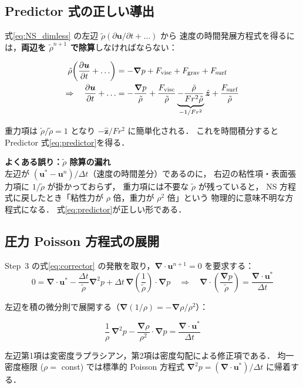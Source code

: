 \documentclass[12pt, a4paper, titlepage]{article}
\newcommand{\jp}[1]{{\normalfont\jpfont #1}}
\newcommand{\pd}[2]{\dfrac{\partial #1}{\partial #2}}
\newcommand{\bu}{\bm{u}}
\newcommand{\bnabla}{\bm{\nabla}}
\begin{document}
\subsection{\jp{Predictor 式の正しい導出}}

\jp{式\eqref{eq:NS_dimless} の左辺 $\tilde\rho(\partial\bu/\partial t + \ldots)$ から
速度の時間発展方程式を得るには，\textbf{両辺を $\tilde\rho^{n+1}$ で除算}しなければならない：}

\begin{align}
  \tilde\rho\!\left(\pd{\bu}{t} + \ldots\right) &= -\bnabla p + F_{\mathrm{visc}} + F_{\mathrm{grav}} + F_{\mathrm{surf}} \notag\\
  \Rightarrow\quad
  \pd{\bu}{t} + \ldots &= -\frac{\bnabla p}{\tilde\rho} + \frac{F_{\mathrm{visc}}}{\tilde\rho}
    \underbrace{- \frac{\tilde\rho}{Fr^2\tilde\rho}}_{-1/Fr^2}\hat{\bm{z}} + \frac{F_{\mathrm{surf}}}{\tilde\rho}
\end{align}

\jp{重力項は $\tilde\rho/\tilde\rho = 1$ となり $-\hat{\bm{z}}/Fr^2$ に簡単化される．
これを時間積分すると Predictor 式\eqref{eq:predictor}を得る．}

\begin{tcolorbox}[warnbox]
\textbf{\jp{よくある誤り：$\tilde\rho$ 除算の漏れ}}\\
\jp{左辺が $(\bu^*-\bu^n)/\Delta t$（速度の時間差分）であるのに，
右辺の粘性項・表面張力項に $1/\tilde\rho$ が掛かっておらず，
重力項には不要な $\tilde\rho$ が残っていると，
NS 方程式に戻したとき「粘性力が $\rho$ 倍，重力が $\rho^2$ 倍」という
物理的に意味不明な方程式になる．
式\eqref{eq:predictor}が正しい形である．}
\end{tcolorbox}

\subsection{\jp{圧力 Poisson 方程式の展開}}

\jp{Step~3 の式\eqref{eq:corrector} の発散を取り，$\bnabla\cdot\bu^{n+1}=0$ を要求する：}
\begin{equation}
  0 = \bnabla\cdot\bu^* - \frac{\Delta t}{\tilde\rho}\bnabla^2 p
    + \Delta t\,\bnabla\!\left(\frac{1}{\tilde\rho}\right)\cdot\bnabla p
  \quad\Rightarrow\quad
  \bnabla\cdot\!\left(\frac{\bnabla p}{\tilde\rho}\right) = \frac{\bnabla\cdot\bu^*}{\Delta t}
\end{equation}

\jp{左辺を積の微分則で展開する（$\bnabla(1/\rho) = -\bnabla\rho/\rho^2$）：}
\begin{tcolorbox}[mybox, title={\jp{展開された変密度 Poisson 方程式}}]
\begin{equation}
  \frac{1}{\rho}\,\bnabla^2 p
  - \frac{\bnabla\rho}{\rho^2}\cdot\bnabla p
  = \frac{\bnabla\cdot\bu^*}{\Delta t}
  \label{eq:PPE_expanded}
\end{equation}
\end{tcolorbox}
\jp{左辺第1項は変密度ラプラシアン，第2項は密度勾配による修正項である．
均一密度極限 ($\rho=$ const) では標準的 Poisson 方程式 $\bnabla^2 p = (\bnabla\cdot\bu^*)/\Delta t$ に帰着する．}
\end{document}
